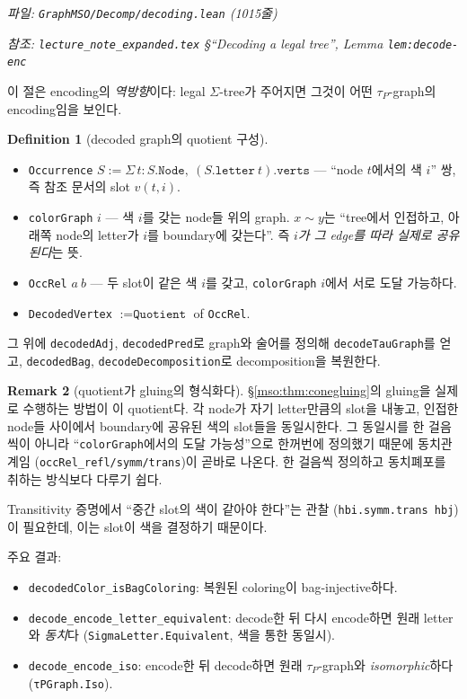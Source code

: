 \documentclass[11pt]{article}
\theoremstyle{definition}
\newtheorem{definition}{Definition}[section]
\newtheorem{remark}[definition]{Remark}
\theoremstyle{plain}
\newcommand{\lean}[1]{\texttt{#1}}
\newcommand{\leanfile}[1]{\texttt{#1}}
\begin{document}
\emph{파일: \leanfile{GraphMSO/Decomp/decoding.lean} (1015줄)}

\emph{참조: \leanfile{lecture\_note\_expanded.tex} \S``Decoding a legal tree'',
Lemma \lean{lem:decode-enc}}

이 절은 encoding의 \emph{역방향}이다: legal $\Sigma$-tree가 주어지면 그것이
어떤 $\tau_P$-graph의 encoding임을 보인다.

\begin{definition}[decoded graph의 quotient 구성]
\label{mso:def:decodedvertex}
\begin{itemize}
  \item \lean{Occurrence} $S := \Sigma\, t : S.\lean{Node},\ (S.\lean{letter}\ t).\lean{verts}$
    --- ``node $t$에서의 색 $i$'' 쌍, 즉 참조 문서의 slot $v(t,i)$.
  \item \lean{colorGraph} $i$ --- 색 $i$를 갖는 node들 위의 graph. $x \sim y$는
    ``tree에서 인접하고, 아래쪽 node의 letter가 $i$를 boundary에 갖는다''.
    즉 \emph{$i$가 그 edge를 따라 실제로 공유된다}는 뜻.
  \item \lean{OccRel} $a\ b$ --- 두 slot이 같은 색 $i$를 갖고,
    \lean{colorGraph} $i$에서 서로 도달 가능하다.
  \item \lean{DecodedVertex} $:= \lean{Quotient}$ of \lean{OccRel}.
\end{itemize}
그 위에 \lean{decodedAdj}, \lean{decodedPred}로 graph와 술어를 정의해
\lean{decodeTauGraph}를 얻고, \lean{decodedBag}, \lean{decodeDecomposition}로
decomposition을 복원한다.
\end{definition}

\begin{remark}[quotient가 gluing의 형식화다]
\label{mso:rem:quotientgluing}
\S\ref{mso:thm:conegluing}의 gluing을 실제로 수행하는 방법이 이 quotient다.
각 node가 자기 letter만큼의 slot을 내놓고, 인접한 node들 사이에서 boundary에
공유된 색의 slot들을 동일시한다. 그 동일시를 한 걸음씩이 아니라
``\lean{colorGraph}에서의 도달 가능성''으로 한꺼번에 정의했기 때문에
동치관계임 (\lean{occRel\_refl/symm/trans})이 곧바로 나온다. 한 걸음씩
정의하고 동치폐포를 취하는 방식보다 다루기 쉽다.

Transitivity 증명에서 ``중간 slot의 색이 같아야 한다''는 관찰
(\lean{hbi.symm.trans hbj})이 필요한데, 이는 slot이 색을 결정하기 때문이다.
\end{remark}

주요 결과:
\begin{itemize}
  \item \lean{decodedColor\_isBagColoring}: 복원된 coloring이 bag-injective하다.
  \item \lean{decode\_encode\_letter\_equivalent}: decode한 뒤 다시 encode하면
    원래 letter와 \emph{동치}다 (\lean{SigmaLetter.Equivalent}, 색을 통한
    동일시).
  \item \lean{decode\_encode\_iso}: encode한 뒤 decode하면 원래 $\tau_P$-graph와
    \emph{isomorphic}하다 (\lean{τPGraph.Iso}).
\end{itemize}
\end{document}
